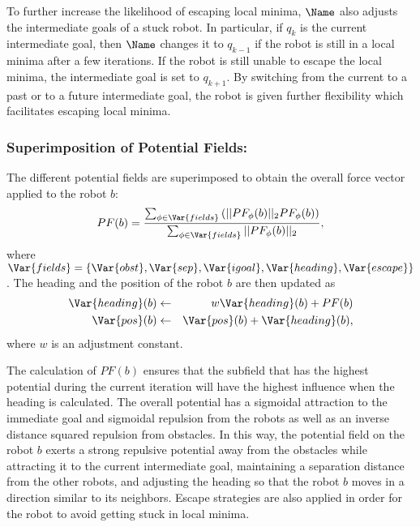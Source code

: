 To further increase the likelihood of escaping local minima, $\Name$
also adjusts the intermediate goals of a stuck robot. In
particular, if $q_k$ is the current intermediate goal, then $\Name$
changes it to $q_{k-1}$ if the robot is still in a local minima after a
few iterations.  If the robot is still unable to escape the local
minima, the intermediate goal is set to $q_{k+1}$. By switching from
the current to a past or to a future intermediate goal, the robot is
given further flexibility which facilitates escaping local minima.


\subsubsection{Superimposition of Potential Fields:}
\label{sec:All}
The different potential fields are superimposed to obtain the overall force
vector applied to the robot $b$: 
$$
PF(b) = \frac{\sum_{\phi \in \Var{fields}} \left(|| PF_\phi(b)||_2
  PF_\phi(b)\right)}{\sum_{\phi \in \Var{fields}} || PF_\phi(b)||_2},
$$
where $\Var{fields} = \{\Var{obst}, \Var{sep}, \Var{igoal},
\Var{heading}, \Var{escape}\}$.
The heading and the position of the robot $b$ are then updated as
\begin{eqnarray*}
\Var{heading}(b) &\leftarrow& w \Var{heading}(b) + PF(b)\\
\Var{pos}(b) &\leftarrow& \Var{pos}(b) + \Var{heading}(b),
\end{eqnarray*}
where $w$ is an adjustment constant. 

The calculation of $PF(b)$ ensures that the subfield that has the
highest potential during the current iteration will have the highest
influence when the heading is calculated. The overall potential has a
sigmoidal attraction to the immediate goal and sigmoidal repulsion
from the robots as well as an inverse distance squared repulsion from
obstacles. In this way, the potential field on the robot $b$ exerts a
strong repulsive potential away from the obstacles while attracting it
to the current intermediate goal, maintaining a separation distance
from the other robots, and adjusting the heading so that the robot $b$
moves in a direction similar to its neighbors. Escape strategies are
also applied in order for the robot to avoid getting stuck in local
minima.



